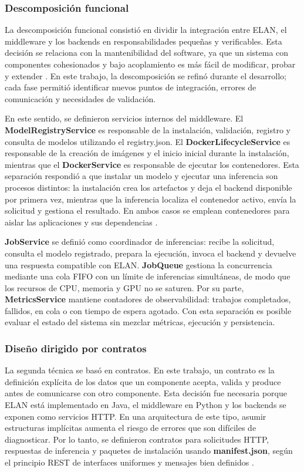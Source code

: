 \documentclass[11pt,a4paper]{article}
\begin{document}
\subsubsection{Descomposición funcional}

La descomposición funcional consistió en dividir la integración entre ELAN, el middleware y los backends en responsabilidades pequeñas y verificables. Esta decisión se relaciona con la mantenibilidad del software, ya que un sistema con componentes cohesionados y bajo acoplamiento es más fácil de modificar, probar y extender \cite{iso25010}. En este trabajo, la descomposición se refinó durante el desarrollo; cada fase permitió identificar nuevos puntos de integración, errores de comunicación y necesidades de validación.

En este sentido, se definieron servicios internos del middleware. El \textbf{ModelRegistryService} es responsable de la instalación, validación, registro y consulta de modelos utilizando el registry.json. El \textbf{DockerLifecycleService} es responsable de la creación de imágenes y el inicio inicial durante la instalación, mientras que el \textbf{DockerService} es responsable de ejecutar los contenedores. Esta separación respondió a que instalar un modelo y ejecutar una inferencia son procesos distintos: la instalación crea los artefactos y deja el backend disponible por primera vez, mientras que la inferencia localiza el contenedor activo, envía la solicitud y gestiona el resultado. En ambos casos se emplean contenedores para aislar las aplicaciones y sus dependencias \cite{docker2026overview}.

\textbf{JobService} se definió como coordinador de inferencias: recibe la solicitud, consulta el modelo registrado, prepara la ejecución, invoca el backend y devuelve una respuesta compatible con ELAN. \textbf{JobQueue} gestiona la concurrencia mediante una cola FIFO con un límite de inferencias simultáneas, de modo que los recursos de CPU, memoria y GPU no se saturen. Por su parte, \textbf{MetricsService} mantiene contadores de observabilidad: trabajos completados, fallidos, en cola o con tiempo de espera agotado. Con esta separación es posible evaluar el estado del sistema sin mezclar métricas, ejecución y persistencia.

\subsubsection{Diseño dirigido por contratos}

La segunda técnica se basó en contratos. En este trabajo, un contrato es la definición explícita de los datos que un componente acepta, valida y produce antes de comunicarse con otro componente. Esta decisión fue necesaria porque ELAN está implementado en Java, el middleware en Python y los backends se exponen como servicios HTTP. En una arquitectura de este tipo, asumir estructuras implícitas aumenta el riesgo de errores que son difíciles de diagnosticar. Por lo tanto, se definieron contratos para solicitudes HTTP, respuestas de inferencia y paquetes de instalación usando \textbf{manifest.json}, según el principio REST de interfaces uniformes y mensajes bien definidos \cite{fielding2000rest}.
\end{document}
